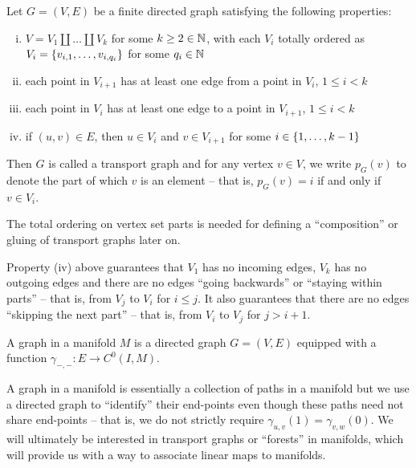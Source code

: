 \documentclass[./Thick_TQFTs_and_Quantum_Information.tex]{subfiles}
\begin{document}
\begin{defn}
Let $G = (V, E)$ be a finite directed graph satisfying the following properties:
\begin{enumerate}[(i)]
\setlength{\itemsep}{0pt}
\item $V = V_1 \amalg \dots \amalg V_k$ for some $k \geq 2 \in \mathbb{N}$, with each
$V_i$ totally ordered as $V_i = \set{v_{i, 1}, \dots, v_{i, q_i}}$ for some
$q_i \in \mathbb{N}$
\item each point in $V_{i + 1}$ has at least one edge from a point in $V_{i}$,
$1 \leq i < k$
\item each point in $V_{i}$ has at least one edge to a point in $V_{i + 1}$,
$1 \leq i < k$
\item if $(u, v) \in E$, then $u \in V_i$ and $v \in V_{i + 1}$ for some
$i \in \set{1, \dots, k - 1}$
\end{enumerate}
Then $G$ is called a transport graph and for any vertex $v \in V$, we write
$p_{G}(v)$ to denote the part of which $v$ is an element -- that is,
$p_G(v) = i$ if and only if $v \in V_i$.
\end{defn}

\begin{rmk}
The total ordering on vertex set parts is needed for defining a ``composition''
or gluing of transport graphs later on.
\end{rmk}

\begin{rmk}
Property (iv) above guarantees that $V_1$ has no incoming edges, $V_k$ has no
outgoing edges and there are no edges ``going backwards'' or ``staying within
parts'' -- that is, from $V_j$ to $V_i$ for $i \leq j$. It also guarantees that
there are no edges ``skipping the next part'' -- that is, from $V_i$ to
$V_j$ for $j > i + 1$.
\end{rmk}

\begin{defn}
A graph in a manifold $M$ is a directed graph $G = (V, E)$ equipped with a
function $\gamma_{-, -} : E \to C^0(I, M)$.
\end{defn}

\begin{rmk}
A graph in a manifold is essentially a collection of paths in a manifold but we
use a directed graph to ``identify'' their end-points even though these paths
need not share end-points -- that is, we do not strictly require
$\gamma_{u, v}(1) = \gamma_{v, w}(0)$. We will ultimately be interested in
transport graphs or ``forests'' in manifolds, which will provide us with a way
to associate linear maps to manifolds.
\end{rmk}
\end{document}
